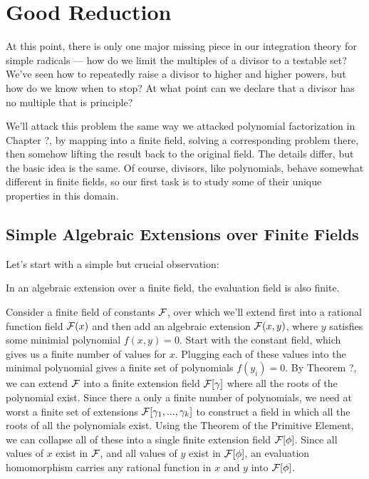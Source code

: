
\chapter{Good Reduction}

At this point, there is only one major missing piece in our
integration theory for simple radicals --- how do we limit the
multiples of a divisor to a testable set?  We've seen how to
repeatedly raise a divisor to higher and higher powers, but how do we
know when to stop?  At what point can we declare that a divisor has no
multiple that is principle?

We'll attack this problem the same way we attacked polynomial
factorization in Chapter ?, by mapping into a finite field, solving a
corresponding problem there, then somehow lifting the result back to
the original field.  The details differ, but the basic idea is the
same.  Of course, divisors, like polynomials, behave somewhat
different in finite fields, so our first task is to study
some of their unique properties in this domain.

\section{Simple Algebraic Extensions over Finite Fields}

Let's start with a simple but crucial observation:

\theorem

In an algebraic extension over a finite field, the evaluation field is
also finite.

\proof

Consider a finite field of constants ${\cal F}$, over which we'll
extend first into a rational function field ${\cal F}(x)$ and then add
an algebraic extension ${\cal F}(x,y)$, where $y$ satisfies some
minimial polynomial $f(x,y)=0$.  Start with the constant field, which
gives us a finite number of values for $x$.  Plugging each of these
values into the minimal polynomial gives a finite set of polynomials
$f(y_i)=0$.  By Theorem ?, we can extend ${\cal F}$ into a finite
extension field ${\cal F}[\gamma]$ where all the roots of the
polynomial exist.  Since there a only a finite number of polynomials,
we need at worst a finite set of extensions ${\cal
F}[\gamma_1,...,\gamma_k]$ to construct a field in which all the roots
of all the polynomials exist.  Using the Theorem of the Primitive
Element, we can collapse all of these into a single finite extension
field ${\cal F}[\phi]$.  Since all values of $x$ exist in ${\cal F}$,
and all values of $y$ exist in ${\cal F}[\phi]$, an evaluation
homomorphism carries any rational function in $x$ and $y$ into
${\cal F}[\phi]$.

